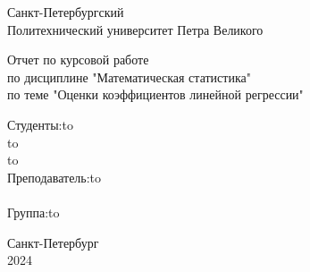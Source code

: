 \documentclass[12pt,a4paper]{article}
\begin{document}
\begin{titlepage}

\Large

\begin{center}
Санкт-Петербургский \\ Политехнический университет Петра Великого

\vspace{10em}

Отчет по курсовой работе\\
по дисциплине "Математическая статистика"\\
по теме "Оценки коэффициентов линейной регрессии"\\

\vspace{2em}

\end{center}

\vspace{6em}

\newbox{\lbox}
\newlength{\maxl}
\setlength{\maxl}{\wd\lbox}
\hfill\parbox{12cm}{
\hspace*{3cm}\hspace*{-5cm}Студенты:\hfill\hbox to\\
\hspace*{3cm}\hspace*{-5cm}\hfill\hbox to\\
\hspace*{3cm}\hspace*{-5cm}\hfill\hbox to\\
\hspace*{3cm}\hspace*{-5cm}Преподаватель:\hfill\hbox to\\
\\
\hspace*{3cm}\hspace*{-5cm}Группа:\hfill\hbox to\\
}

\vspace{\fill}

\begin{center}
Санкт-Петербург \\2024
\end{center}

\end{titlepage}
\end{document}
